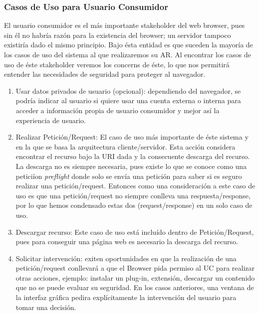 	\subsubsection{Casos de Uso para Usuario Consumidor}
		El usuario consumidor es el más importante stakeholder del web browser, pues sin él no habría razón para la existencia del browser; un servidor tampoco existiría dado el mismo principio. Bajo ésta entidad es que suceden la mayoría de los casos de uso del sistema al que realizaremos su AR. Al encontrar los casos de uso de éste stakeholder veremos los concerns de éste, lo que nos permitirá entender las necesidades de seguridad para proteger al navegador.
			\begin{enumerate}
				\item Usar datos privados de usuario (opcional): dependiendo del navegador, se podría indicar al usuario si quiere usar una cuenta externa o interna para acceder a información propia de usuario consumidor y mejor así la experiencia de usuario.

				\item Realizar Petición/Request: El caso de uso más importante de éste sistema y en la que se basa la arquitectura cliente/servidor. Esta acción considera encontrar el recurso bajo la URI dada y la consecuente descarga del recurso. La descarga no es siempre necesaria, pues existe lo que se conoce como una peticiíon \textit{preflight} donde solo se envía una petición para saber si es seguro realizar una petición/request. Entonces como una consideración a este caso de uso es que una petición/request no siempre conlleva una respuesta/response, por lo que hemos condensado estas dos (request/response) en un solo caso de uso. 

				\item Descargar recurso: Este caso de uso está incluído dentro de Petición/Request, pues para conseguir una página web es necesario la descarga del recurso.

				\item Solicitar intervención: exiten oportunidades en que la realización de una petición/request conllevará a que el Browser pida permiso al UC para realizar otras acciones, ejemplo: instalar un plug-in, extensión, descargar un contenido que no se puede evaluar su seguridad. En los casos anteriores, una ventana de la interfaz gráfica pedira explícitamente la intervención del usuario para tomar una decisión.

			\end{enumerate}

